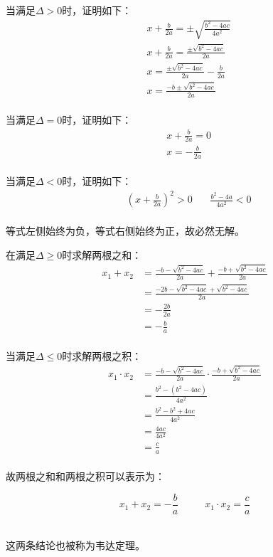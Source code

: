 \documentclass[UTF8]{ctexart}
\begin{document}
    当满足$\Delta>0$时，证明如下：
    \setcounter{equation}{0}
    \begin{align}
        &x+\frac{b}{2a}=\pm\sqrt{\frac{b^2-4ac}{4a^2}}\\[4mm]
        &x+\frac{b}{2a}=\frac{\pm\sqrt{b^2-4ac}}{2a}\\[4mm]
        &x=\frac{\pm\sqrt{b^2-4ac}}{2a}-\frac{b}{2a}\\[4mm]
        &x=\frac{-b\pm\sqrt{b^2-4ac}}{2a}
    \end{align}\\
    当满足$\Delta=0$时，证明如下：
    \begin{align}
        &x+\frac{b}{2a}=0\\[4mm]
        &x=-\frac{b}{2a}
    \end{align}\\
    当满足$\Delta<0$时，证明如下：
    \begin{align}
        &\left(x+\frac{b}{2a}\right)^2>0~~~~~~~~\frac{b^2-4a}{4a^2}<0
    \end{align}\\
    等式左侧始终为负，等式右侧始终为正，故必然无解。

\newpage

    在满足$\Delta\geq 0$时求解两根之和：\vspace{5pt}
    \setcounter{equation}{0}
    \begin{align}
        x_1+x_2
        &=\frac{-b-\sqrt{b^2-4ac}}{2a}+\frac{-b+\sqrt{b^2-4ac}}{2a}\\[3mm]
        &=\frac{-2b-\sqrt{b^2-4ac}+\sqrt{b^2-4ac}}{2a}\\[3mm]
        &=-\frac{2b}{2a}\\[3mm]
        &=-\frac{b}{a}
    \end{align}\\
    当满足$\Delta\leq 0$时求解两根之积：\vspace{5pt}
    \begin{align}
        x_1\cdot x_2
        &=\frac{-b-\sqrt{b^2-4ac}}{2a}\cdot\frac{-b+\sqrt{b^2-4ac}}{2a}\\[3mm]
        &=\frac{b^2-\left(b^2-4ac\right)}{4a^2}\\[3mm]
        &=\frac{b^2-b^2+4ac}{4a^2}\\[3mm]
        &=\frac{4ac}{4a^2}\\[3mm]
        &=\frac{c}{a}
    \end{align}\\
    故两根之和和两根之积可以表示为：
    \begin{large}
        \begin{equation*}
            x_1+x_2=-\frac{b}{a}~~~~~~~~~~~~x_1\cdot x_2=\frac{c}{a}
        \end{equation*}
    \end{large}\\
    这两条结论也被称为韦达定理。
\end{document}
